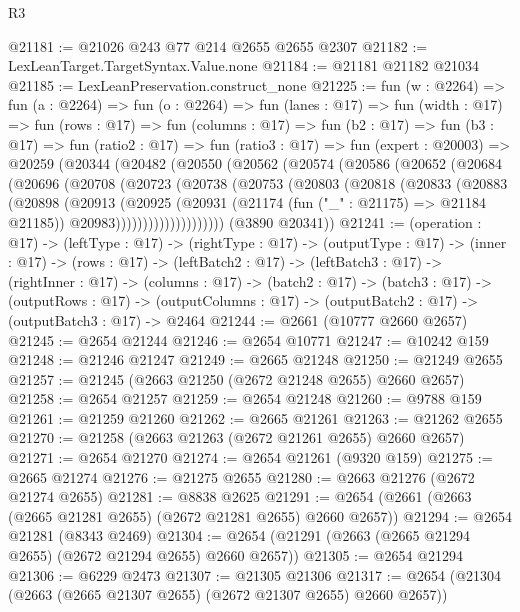 \begin{lexlean}{R3}
\begin{coremodule}
@21181 := @21026 @243 @77 @214 @2655 @2655 @2307
@21182 := LexLeanTarget.TargetSyntax.Value.none
@21184 := @21181 @21182 @21034
@21185 := LexLeanPreservation.construct_none
@21225 := fun (w : @2264) =>
  fun (a : @2264) =>
  fun (o : @2264) =>
  fun (lanes : @17) =>
  fun (width : @17) =>
  fun (rows : @17) =>
  fun (columns : @17) =>
  fun (b2 : @17) =>
  fun (b3 : @17) =>
  fun (ratio2 : @17) =>
  fun (ratio3 : @17) =>
  fun (expert : @20003) =>
  @20259
    (@20344
      (@20482
        (@20550
          (@20562
            (@20574
              (@20586
                (@20652
                  (@20684
                    (@20696
                      (@20708
                        (@20723
                          (@20738
                            (@20753
                              (@20803
                                (@20818
                                  (@20833
                                    (@20883
                                      (@20898
                                        (@20913
                                          (@20925
                                            (@20931
                                              (@21174 (fun ("_" : @21175) => @21184 @21185))
                                              @20983))))))))))))))))))))
      (@3890 @20341))
@21241 := (operation : @17) ->
  (leftType : @17) ->
  (rightType : @17) ->
  (outputType : @17) ->
  (inner : @17) ->
  (rows : @17) ->
  (leftBatch2 : @17) ->
  (leftBatch3 : @17) ->
  (rightInner : @17) ->
  (columns : @17) ->
  (batch2 : @17) ->
  (batch3 : @17) ->
  (outputRows : @17) ->
  (outputColumns : @17) -> (outputBatch2 : @17) -> (outputBatch3 : @17) -> @2464
@21244 := @2661 (@10777 @2660 @2657)
@21245 := @2654 @21244
@21246 := @2654 @10771
@21247 := @10242 @159
@21248 := @21246 @21247
@21249 := @2665 @21248
@21250 := @21249 @2655
@21257 := @21245 (@2663 @21250 (@2672 @21248 @2655) @2660 @2657)
@21258 := @2654 @21257
@21259 := @2654 @21248
@21260 := @9788 @159
@21261 := @21259 @21260
@21262 := @2665 @21261
@21263 := @21262 @2655
@21270 := @21258 (@2663 @21263 (@2672 @21261 @2655) @2660 @2657)
@21271 := @2654 @21270
@21274 := @2654 @21261 (@9320 @159)
@21275 := @2665 @21274
@21276 := @21275 @2655
@21280 := @2663 @21276 (@2672 @21274 @2655)
@21281 := @8838 @2625
@21291 := @2654 (@2661 (@2663 (@2665 @21281 @2655) (@2672 @21281 @2655) @2660 @2657))
@21294 := @2654 @21281 (@8343 @2469)
@21304 := @2654 (@21291 (@2663 (@2665 @21294 @2655) (@2672 @21294 @2655) @2660 @2657))
@21305 := @2654 @21294
@21306 := @6229 @2473
@21307 := @21305 @21306
@21317 := @2654 (@21304 (@2663 (@2665 @21307 @2655) (@2672 @21307 @2655) @2660 @2657))

\end{coremodule}
\end{lexlean}
